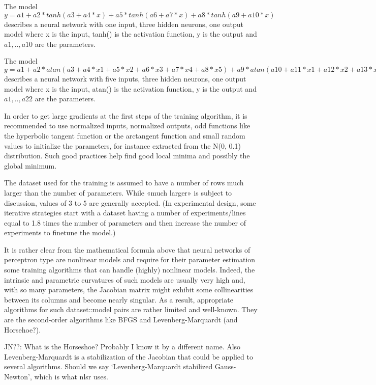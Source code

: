 The model
\(y = a1 + a2*tanh(a3 + a4*x) + a5*tanh(a6 + a7*x) + a8*tanh(a9 + a10*x)\)
describes a neural network with one input, three hidden neurons, one
output model where x is the input, tanh() is the activation function, y
is the output and \(a1,..,a10\) are the parameters.

The model
\(y = a1 + a2*atan(a3 + a4*x1 + a5*x2 + a6*x3 + a7*x4 + a8*x5) + a9*atan(a10 + a11*x1 + a12*x2 + a13*x3 + a14*x4 + a15*x5) + a16*atan(a17 + a18*x1 + a19*x2 + a20*x3 + a21*x4 + a22*x5)\)
describes a neural network with five inputs, three hidden neurons, one
output model where x is the input, atan() is the activation function, y
is the output and \(a1,..,a22\) are the parameters.

In order to get large gradients at the first steps of the training
algorithm, it is recommended to use normalized inputs, normalized
outputs, odd functions like the hyperbolic tangent function or the
arctangent function and small random values to initialize the
parameters, for instance extracted from the N(0, 0.1) distribution. Such
good practices help find good local minima and possibly the global
minimum.

The dataset used for the training is assumed to have a number of rows
much larger than the number of parameters. While «much larger» is
subject to discussion, values of 3 to 5 are generally accepted. (In
experimental design, some iterative strategies start with a dataset
having a number of experiments/lines equal to 1.8 times the number of
parameters and then increase the number of experiments to finetune the
model.)

It is rather clear from the mathematical formula above that neural
networks of perceptron type are nonlinear models and require for their
parameter estimation some training algorithms that can handle (highly)
nonlinear models. Indeed, the intrinsic and parametric curvatures of
such models are usually very high and, with so many parameters, the
Jacobian matrix might exhibit some collinearities between its columns
and become nearly singular. As a result, appropriate algorithms for such
dataset::model pairs are rather limited and well-known. They are the
second-order algorithms like BFGS and Levenberg-Marquardt (and
Horsehoe?).

JN??: What is the Horseshoe? Probably I know it by a different name.
Also Levenberg-Marquardt is a stabilization of the Jacobian that could
be applied to several algorithms. Should we say `Levenberg-Marquardt
stabilized Gauss-Newton', which is what nlsr uses.

